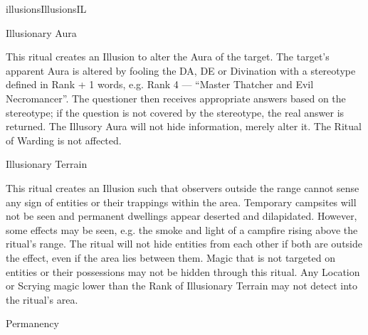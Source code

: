 \begin{College}[1.5]{illusions}{Illusions}{IL}
\begin{ritual}[R-1]{Illusionary Aura}
\begin{effects}
This ritual creates an Illusion to alter the Aura of the target.  The
target’s apparent Aura is altered by fooling the DA, DE or Divination
with a stereotype defined in Rank + 1 words, e.g. Rank 4 --- “Master
Thatcher and Evil Necromancer”.  The questioner then receives
appropriate answers based on the stereotype; if the question is not
covered by the stereotype, the real answer is returned.  The Illusory
Aura will not hide information, merely alter it. The Ritual of Warding
is not affected.
\end{effects}
\end{ritual}

\begin{ritual}[R-2]{Illusionary Terrain}

\begin{effects}
This ritual creates an Illusion such that observers outside the range
cannot sense any sign of entities or their trappings within the area.
Temporary campsites will not be seen and permanent dwellings appear
deserted and dilapidated.  However, some effects may be seen, e.g. the
smoke and light of a campfire rising above the ritual’s range.  The
ritual will not hide entities from each other if both are outside the
effect, even if the area lies between them.  Magic that is not
targeted on entities or their possessions may not be hidden through
this ritual.  Any Location or Scrying magic lower than the Rank of
Illusionary Terrain may not detect into the ritual’s area.
\end{effects}
\end{ritual}

\begin{ritual}[R-3]{Permanency}


\end{ritual}
\end{College}
